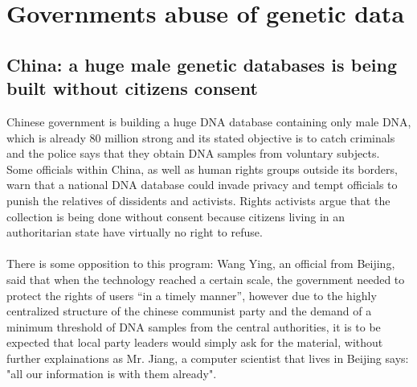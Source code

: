 \documentclass[12pt]{article}
\begin{document}
\newpage
\section{Governments abuse of genetic data}
\label{sec:abuses}
\subsection{China: a huge male genetic databases is being built without citizens consent}
Chinese government is building a huge DNA database containing only male DNA, which is already 80 million strong and 
its stated objective is to catch criminals and the police says that they obtain DNA samples from voluntary subjects. \cite{china_collect_dna}\\
Some officials within China, as well as human rights groups outside its borders, warn that a national DNA database could invade privacy and tempt officials to punish the relatives of dissidents
 and activists. Rights activists argue that the collection is being done without consent because citizens living in an authoritarian state have virtually no right to refuse.\\
\\
There is some opposition to this program: Wang Ying, an official from Beijing, said that when the technology reached a certain scale, 
the government needed to protect the rights of users “in a timely manner”, however due to the highly centralized structure of the chinese communist party and the demand of a minimum threshold 
of DNA samples from the central authorities, it is to be expected that local party leaders would simply ask for the material, without further explainations as Mr. Jiang, 
a computer scientist that lives in Beijing says: "all our information is with them already"\cite{china_collect_dna}.
\end{document}
